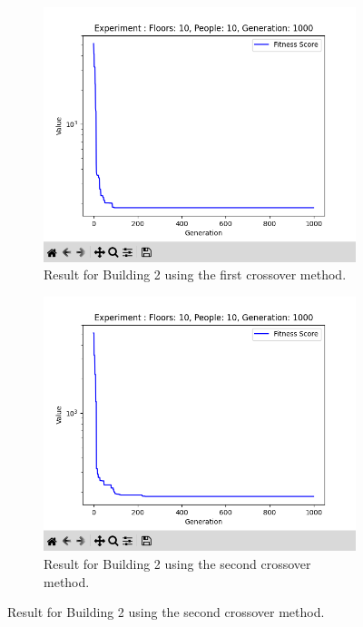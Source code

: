\begin{figure}[h]
	\centering
	\begin{subfigure}[b]{0.32\linewidth}
		\centering
		\includegraphics[width=\linewidth]{results/B2_Co1.png}
		\caption{Result for Building 2 using the first crossover method.}
		\label{fig:results/B2_Co1}
	\end{subfigure}
	\hfill
	\begin{subfigure}[b]{0.32\linewidth}
		\centering
		\includegraphics[width=\linewidth]{results/B2_Co2.png}
		\caption{Result for Building 2 using the second crossover method.}

\end{subfigure}
\end{figure}
